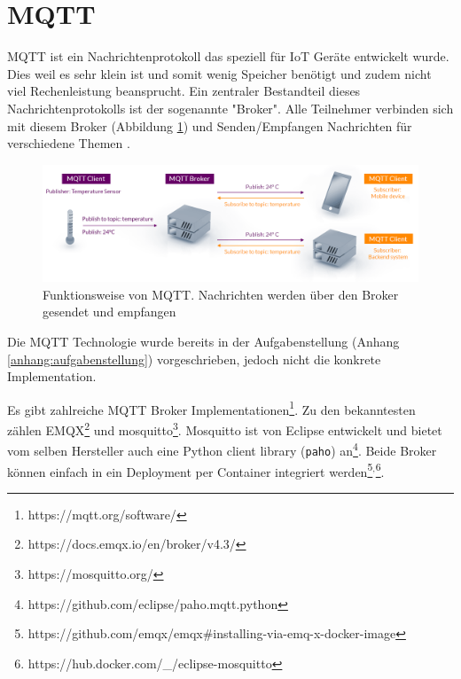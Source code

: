 
\section{MQTT} %
\label{state:mqtt}

\ac{MQTT} ist ein Nachrichtenprotokoll das speziell für \ac{IoT} Geräte entwickelt wurde.
Dies weil es sehr klein ist und somit wenig Speicher benötigt und zudem
nicht viel Rechenleistung beansprucht.
Ein zentraler Bestandteil dieses Nachrichtenprotokolls ist der sogenannte "Broker".
Alle Teilnehmer verbinden sich mit diesem Broker (Abbildung \ref{fig:mqtt}) und Senden/Empfangen Nachrichten
für verschiedene Themen \parencite{mqtt}.

\begin{figure}[H]
    \centering
    \includegraphics[width=1.0\textwidth]{gfx/mqtt-publish-subscribe}
    \caption{
        Funktionsweise von \ac{MQTT}. Nachrichten werden über den Broker gesendet und empfangen \parencite{mqtt}
    }
    \label{fig:mqtt}
\end{figure}

Die \ac{MQTT} Technologie wurde bereits in der Aufgabenstellung (Anhang \ref{anhang:aufgabenstellung}) vorgeschrieben, jedoch
nicht die konkrete Implementation.

Es gibt zahlreiche \ac{MQTT} Broker Implementationen\footnote{https://mqtt.org/software/}.
Zu den bekanntesten zählen EMQX\footnote{https://docs.emqx.io/en/broker/v4.3/} und mosquitto\footnote{https://mosquitto.org/}.
Mosquitto ist von Eclipse entwickelt und bietet vom selben Hersteller auch eine
Python client library (\texttt{paho}) an\footnote{https://github.com/eclipse/paho.mqtt.python}.
Beide Broker können einfach in ein Deployment per Container integriert werden\footnote{https://github.com/emqx/emqx\#installing-via-emq-x-docker-image}$^{,}$\footnote{https://hub.docker.com/\_/eclipse-mosquitto}.

